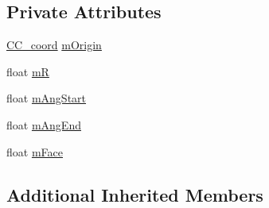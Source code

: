 \subsection*{Private Attributes}
\begin{DoxyCompactItemize}
\item 
\hyperlink{a00029}{C\-C\-\_\-coord} \hyperlink{a00006_a8dfd55b23f76e9f9987f8ea9e4e3239a}{m\-Origin}
\item 
float \hyperlink{a00006_a1a720ab7b39b95a6a8116308f50b02a8}{m\-R}
\item 
float \hyperlink{a00006_a50c782c031d209ac040c71b0792be40e}{m\-Ang\-Start}
\item 
float \hyperlink{a00006_a03d54f905dbfd4927a10e4f9e23fcfb9}{m\-Ang\-End}
\item 
float \hyperlink{a00006_aa513da05df7bf1998098c4fc9234a1e5}{m\-Face}
\end{DoxyCompactItemize}
\subsection*{Additional Inherited Members}


